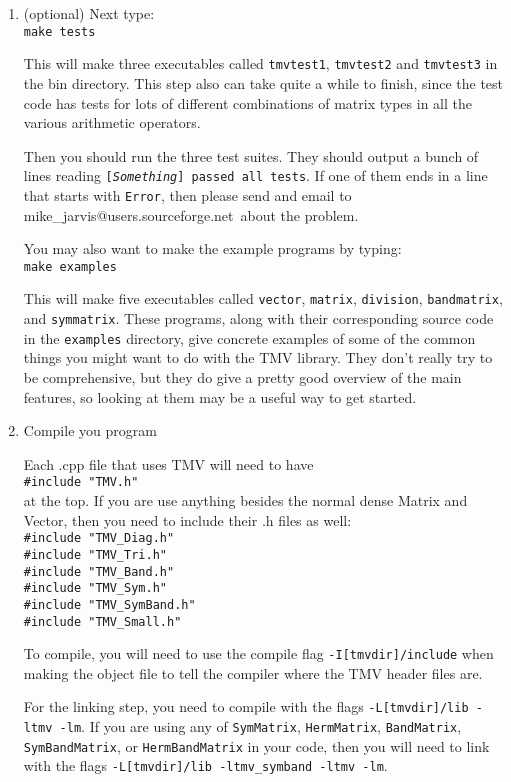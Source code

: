 \documentclass[twoside,letterpaper,11pt]{article}
\makeatletter
\renewcommand{\tt}[1]{{\texttt {#1}}}
\newcommand{\myemail}{mike\_jarvis@users.sourceforge.net}
\makeatother
\begin{document}
\begin{enumerate}
\item
(optional) Next type:\\
\tt{make tests}

This will make three executables called \tt{tmvtest1}, 
\tt{tmvtest2} and \tt{tmvtest3} in the bin directory.
This step also can take quite a while to finish, since the test code has tests
for lots of different combinations of matrix types in all the various 
arithmetic operators.

Then you should run the three test suites.
They should output a bunch of lines reading \tt{[{\em Something}] passed all tests}.
If one of them ends in a line that starts with \tt{Error}, 
then please send and email to \myemail\ about the problem.

You may also want to make the example programs by typing:\\
\tt{make examples}

This will make five executables called \tt{vector}, \tt{matrix}, \tt{division},
\tt{bandmatrix}, and \tt{symmatrix}.
These programs, along with their corresponding source code in the \tt{examples}
directory, give concrete examples of some of the common things you might want
to do with the TMV library.  They don't really try to be comprehensive,
but they do give a pretty good overview of the main features,
so looking at them may be a useful way to get started.

\item
Compile you program

Each .cpp file that uses TMV will need to have \\
\tt{\#include "TMV.h"}\\
at the top.
If you are use anything besides the normal dense Matrix and Vector, 
then you need to include their .h files as well:\\
\tt{\#include "TMV\_Diag.h"}\\
\tt{\#include "TMV\_Tri.h"}\\
\tt{\#include "TMV\_Band.h"}\\
\tt{\#include "TMV\_Sym.h"}\\
\tt{\#include "TMV\_SymBand.h"}\\
\tt{\#include "TMV\_Small.h"}

To compile, you will need to use the compile flag
\tt{-I[tmvdir]/include} when making the object file to tell the 
compiler where the TMV header files are.

For the linking step, you need to compile with the flags
\tt{-L[tmvdir]/lib -ltmv -lm}.
If you are using any of \tt{SymMatrix}, \tt{HermMatrix}, \tt{BandMatrix}, 
\tt{SymBandMatrix}, or \tt{HermBandMatrix} in your code, then you will 
need to link with the flags \tt{-L[tmvdir]/lib -ltmv\_symband -ltmv -lm}.


\end{enumerate}
\end{document}
